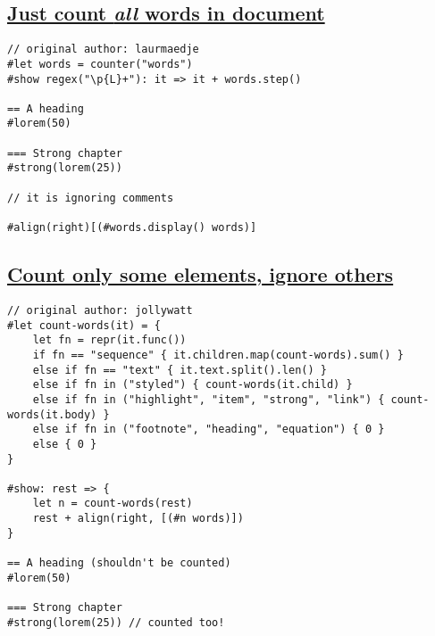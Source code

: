 \pandocbounded{}

\subsection{\texorpdfstring{\hyperref[just-count-all-words-in-document]{Just
count \emph{all} words in
document}}{Just count all words in document}}\label{just-count-all-words-in-document}

\begin{verbatim}
// original author: laurmaedje
#let words = counter("words")
#show regex("\p{L}+"): it => it + words.step()

== A heading
#lorem(50)

=== Strong chapter
#strong(lorem(25))

// it is ignoring comments

#align(right)[(#words.display() words)]
\end{verbatim}

\pandocbounded{}

\subsection{\texorpdfstring{\hyperref[count-only-some-elements-ignore-others]{Count
only some elements, ignore
others}}{Count only some elements, ignore others}}\label{count-only-some-elements-ignore-others}

\begin{verbatim}
// original author: jollywatt
#let count-words(it) = {
    let fn = repr(it.func())
    if fn == "sequence" { it.children.map(count-words).sum() }
    else if fn == "text" { it.text.split().len() }
    else if fn in ("styled") { count-words(it.child) }
    else if fn in ("highlight", "item", "strong", "link") { count-words(it.body) }
    else if fn in ("footnote", "heading", "equation") { 0 }
    else { 0 }
}

#show: rest => {
    let n = count-words(rest)
    rest + align(right, [(#n words)])
}

== A heading (shouldn't be counted)
#lorem(50)

=== Strong chapter
#strong(lorem(25)) // counted too!
\end{verbatim}

\pandocbounded{}


